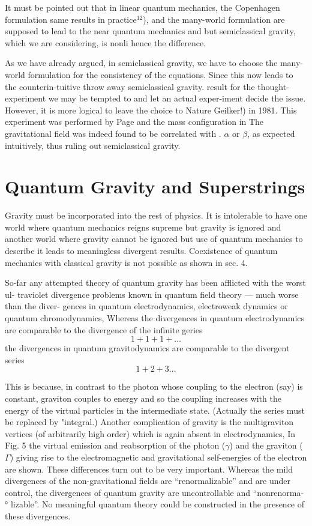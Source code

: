 It must be pointed out that in linear quantum mechanics, the Copenhagen formulation
same results in practice$^{12}$),
and the many-world formulation are supposed to lead to the
near quantum mechanics and
but semiclassical gravity, which we are considering, is nonli
hence the difference.

As we have already argued, in semiclassical gravity, we have to choose the many-world
formulation for the consistency of the equations. Since this now leads to the counterin-tuitive
throw away semiclassical gravity.
 result for the thought-experiment we may be tempted to
and let an actual exper-iment decide the issue.
 However, it is more logical to leave the choice to Nature
Geilker!) in 1981.
 This experiment was performed by Page and
the mass configuration in
The gravitational field was indeed found to be correlated with
. $\alpha$ or $\beta$, as expected intuitively, thus ruling out semiclassical gravity.

\section{Quantum Gravity and Superstrings}

Gravity must be incorporated into the rest of physics.
It is intolerable to have one
world where quantum mechanics reigns supreme but gravity is ignored and another world
where gravity cannot be ignored but use of quantum mechanics to describe it leads to
meaningless divergent results. Coexistence of quantum mechanics with classical gravity is
not possible as shown in sec. 4.

So-far any attempted theory of quantum gravity has been afflicted with the worst ul-
traviolet divergence problems known in quantum field theory — much worse than the diver-
gences in quantum electrodynamics, electroweak dynamics or quantum chromodynamics,
Whereas the divergences in quantum electrodynamics are comparable to the divergence of
the infinite geries
$$
1 + 1+ 1 + \ldots
$$
the divergences in quantum gravitodynamics are comparable to the divergent series
$$
1 + 2 + 3 \ldots
$$

This is because, in contrast to the photon whose coupling to the electron (say) is constant,
graviton couples to energy and so the coupling increases with the energy of the virtual
particles in the intermediate state.
(Actually the series must be replaced by "integral.)
Another complication of gravity is the multigraviton vertices (of arbitrarily high order)
which is again absent in electrodynamics, In Fig. 5 the virtual emission and reabsorption
of the photon ($\gamma$) and the graviton ($\Gamma$) giving rise to the electromagnetic and gravitational
self-energies of the electron are shown. These differences turn out to be very important.
Whereas the mild divergences of the non-gravitational fields are “renormalizable” and are
under control, the divergences of quantum gravity are uncontrollable and “nonrenorma- °
lizable”.
No meaningful quantum theory could be constructed in the presence of these
divergences.

